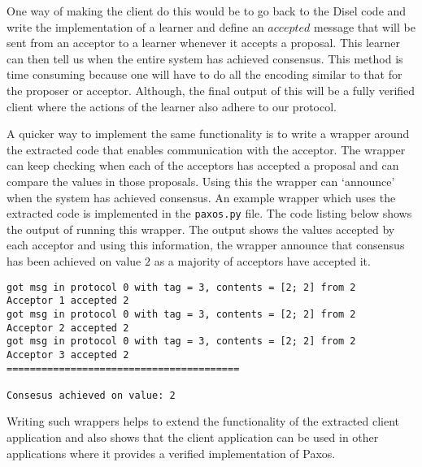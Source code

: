 One way of making the client do this would be to go back to the Disel code and
write the implementation of a learner and define an $accepted$ message that will
be sent from an acceptor to a learner whenever it accepts a proposal. This learner
can then tell us when the entire system has achieved consensus. This method is
time consuming because one will have to do all the encoding similar to that for
the proposer or acceptor. Although, the final output of this will be a fully
verified client where the actions of the learner also adhere to our protocol.

A quicker way to implement the same functionality is to write a
wrapper around the extracted code that enables communication with the
acceptor. The wrapper can keep checking when each of the acceptors has accepted
a proposal and can compare the values in those proposals. Using this the wrapper
can `announce' when the system has achieved consensus. An example wrapper which
uses the extracted code is implemented in the \texttt{paxos.py} file. The code
listing below shows the output of running this wrapper. The output shows
the values accepted by each acceptor and using this information, the wrapper
announce that consensus has been achieved on value $2$ as a majority of
acceptors have accepted it.

\begin{lstlisting}
got msg in protocol 0 with tag = 3, contents = [2; 2] from 2
Acceptor 1 accepted 2
got msg in protocol 0 with tag = 3, contents = [2; 2] from 2
Acceptor 2 accepted 2
got msg in protocol 0 with tag = 3, contents = [2; 2] from 2
Acceptor 3 accepted 2
========================================

Consesus achieved on value: 2
\end{lstlisting}


Writing such wrappers helps to extend the functionality of the extracted
client application and also shows that the client application can be used in
other applications where it provides a verified implementation of Paxos.


